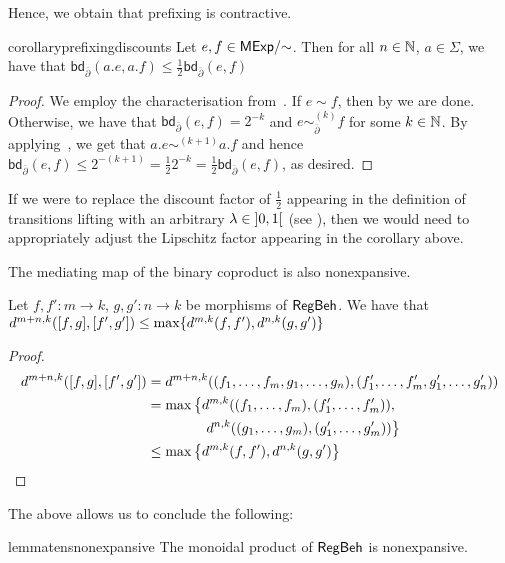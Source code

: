 Hence, we obtain that prefixing is contractive.
\begin{restatable}{corollary}{prefixingdiscounts}\label{cor:prefixing_discounts}
	Let $e,f \in {\mathsf{MExp}}/{\sim}$. Then for all $n \in \mathbb{N}$, $a \in \Sigma$, we have that
	$
		\mathsf{bd}_{\overline{\partial}}(a.e,a.f) \leq \frac{1}{2}\mathsf{bd}_{\overline{\partial}}(e,f)
	$
\end{restatable}
\begin{proof}
	We employ the characterisation from~. If $e \sim f$, then by  we are done. Otherwise, we have that $\mathsf{bd}_{\overline\partial}(e,f)=2^{-k}$ and $e \sim^{(k)}_{\overline\partial} f$ for some $k \in \mathbb{N}$. By applying~, we get that $a.e \sim^{(k+1)} a.f$ and hence $\mathsf{bd}_{\overline\partial}(e,f)\leq 2^{-(k+1)} = \frac{1}{2} 2^{-k} = \frac{1}{2}\mathsf{bd}_{\overline\partial}(e,f)$, as desired. 
\end{proof}
\begin{remark}
	If we were to replace the discount factor of $\frac{1}{2}$ appearing in the definition of transitions lifting with an arbitrary $\lambda \in \interval[open]{0}{1}$ (see ), then we would need to appropriately adjust the Lipschitz factor appearing in the corollary above.
\end{remark}
The mediating map of the binary coproduct is also nonexpansive.
\begin{lemma}\label{lem:pairs_nonexpansive}
	Let $f,f' \colon m \to k$, $g,g' \colon n \to k$ be morphisms of $\mathsf{RegBeh}$. We have that $d^{m +n, k}([ f, g ], [ f', g' ]) \leq \max \{d^{m,k}(f,f'), d^{n,k}(g,g')\}$
\end{lemma}
\begin{proof}
	\begin{align*}
		d^{m +n, k}([ f, g ], [ f', g' ]) &= d^{m +n, k}((f_1, \dots, f_m, g_1, \dots, g_n), (f'_1, \dots, f'_m, g'_1, \dots, g'_n)) \\
		&=\max \left\{d^{m,k}((f_1, \dots, f_m), (f'_1, \dots, f'_m)),\right.\\&\qquad \qquad\left. d^{n,k}((g_1, \dots, g_m), (g'_1, \dots, g'_m)) \right\}\\
		&\leq \max \left\{d^{m,k}(f,f'),d^{n,k}(g,g') \right\} \tag*{\hfill\qedhere}
	\end{align*}
\end{proof}
The above allows us to conclude the following:
\begin{restatable}{lemma}{tensnonexpansive}\label{lem:tens_nonexpansive}
	The monoidal product of $\mathsf{RegBeh}$ is nonexpansive.
\end{restatable}
